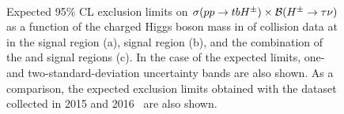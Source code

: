 		\begin{figure}
		\centering
		 \\
		\caption{\label{fig:expected-limits} 
		Expected 95\% CL exclusion limits on $\sigma(pp\to tbH^{\pm})\times \mathrm{\cal{B}}(H^{\pm} \to \tau \nu)$ as a function of the charged Higgs boson mass in \LUMI of \pp collision data at \sqs in the \taujets signal region (a), \taulep signal region (b), and the combination of the \taujets and \taulep signal regions (c). In the case of the expected limits, one- and two-standard-deviation uncertainty bands are also shown. As a comparison, the expected exclusion limits obtained with the dataset collected in 2015 and 2016~\cite{hpm-previous} are also shown.
		 }
		\end{figure}